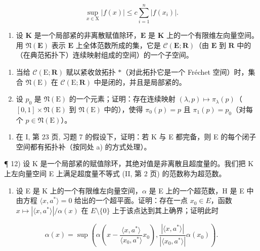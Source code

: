 \[
\sup _ {x \in \mathrm{X}} | f (x) | \leqslant c \sum_ {i = 1} ^ {n} | f (x _ {i}) |.
\]

\begin{enumerate}
\def\labelenumi{\arabic{enumi})}
\setcounter{enumi}{9}
\tightlist
\item
  设 \(\mathbf{K}\) 是一个局部紧的非离散赋值除环，\(\mathbf{E}\) 是 \(\mathbf{K}\) 上的一个有限维左向量空间。用 \(\mathfrak{N}(\mathbf{E})\) 表示 \(\mathbf{E}\) 上全体范数所成的集，它是 \(\mathcal{C}(\mathbf{E};\mathbf{R})\)（由 \(\mathbf{E}\) 到 \(\mathbf{R}\) 中的（在典范拓扑下）连续映射组成的空间）的一个子空间。
\end{enumerate}

\begin{enumerate}
\def\labelenumi{\alph{enumi})}
\item
  当给 \(\mathcal{C}(\mathrm{E};\mathbf{R})\) 赋以紧收敛拓扑 \(*\)（对此拓扑它是一个 Fréchet 空间）时，集合 \(\mathfrak{N}(\mathrm{E})\) 在 \(\mathcal{C}(\mathrm{E};\mathbf{R})\) 中是闭的，并且是局部紧的。
\item
  设 \(p_0\) 是 \(\mathfrak{N}(\mathrm{E})\) 的一个元素；证明：存在连续映射 \((\lambda, p) \mapsto \pi_{\lambda}(p)\)（\([0, 1] \times \mathfrak{N}(\mathrm{E})\) 到 \(\mathfrak{N}(\mathrm{E})\) 中的），使得 \(\pi_0(p) = p\) 且 \(\pi_1(p) = p_0\)（对每个 \(p \in \mathfrak{N}(\mathrm{E})\)）。
\end{enumerate}

\begin{enumerate}
\def\labelenumi{\arabic{enumi})}
\setcounter{enumi}{10}
\tightlist
\item
  在 I, 第 23 页, 习题 7 的假设下，证明：若 K 与 E 都完备，则 E 的每个闭子空间都有拓扑补（按同处 a) 的方式处理）。
\end{enumerate}

¶ 12) 设 K 是一个局部紧的赋值除环，其绝对值是非离散且超度量的。我们把 K 上左向量空间 E 上满足超度量不等式 (II, 第 2 页) 的范数称为超范数。

\begin{enumerate}
\def\labelenumi{\alph{enumi})}
\tightlist
\item
  设 E 是 K 上的一个有限维左向量空间，\(\alpha\) 是 E 上的一个超范数，H 是 E 中由方程 \(\langle x, a^{*} \rangle = 0\) 给出的一个超平面。证明：存在一点 \(x_{0} \in E\)，函数 \(x \mapsto |\langle x, a^{*} \rangle| / \alpha(x)\) 在 \(E \setminus \{0\}\) 上于该点达到其上确界；证明此时
\end{enumerate}

\[
\alpha (x) = \sup \left(\alpha \left(x - \frac {\langle x , a ^ {*} \rangle}{\langle x _ {0} , a ^ {*} \rangle} x _ {0}\right), \frac {| \langle x , a ^ {*} \rangle |}{| \langle x _ {0} , a ^ {*} \rangle |} \alpha (x _ {0})\right).
\]

